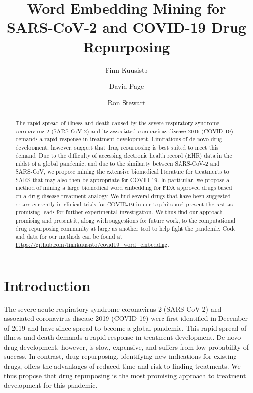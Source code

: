 \documentclass{article}
\begin{document}
\title{Word Embedding Mining for SARS-CoV-2 and COVID-19 Drug Repurposing}
\author[1]{Finn Kuusisto}
\author[2]{David Page}
\author[1]{Ron Stewart}
\maketitle

\begin{abstract}

The rapid spread of illness and death caused by the severe respiratory syndrome coronavirus 2 (SARS-CoV-2) and its associated coronavirus disease 2019 (COVID-19) demands a rapid response in treatment development.
Limitations of de novo drug development, however, suggest that drug repurposing is best suited to meet this demand.
Due to the difficulty of accessing electronic health record (EHR) data in the midst of a global pandemic, and due to the similarity between SARS-CoV-2 and SARS-CoV, we propose mining the extensive biomedical literature for treatments to SARS that may also then be appropriate for COVID-19.
In particular, we propose a method of mining a large biomedical word embedding for FDA approved drugs based on a drug-disease treatment analogy.
We find several drugs that have been suggested or are currently in clinical trials for COVID-19 in our top hits and present the rest as promising leads for further experimental investigation.
We thus find our approach promising and present it, along with suggestions for future work, to the computational drug repurposing community at large as another tool to help fight the pandemic.
Code and data for our methods can be found at \url{https://github.com/finnkuusisto/covid19_word_embedding}.

\end{abstract}

\section{Introduction}

The severe acute respiratory syndrome coronavirus 2 (SARS-CoV-2) and associated coronavirus disease 2019 (COVID-19) were first identified in December of 2019 and have since spread to become a global pandemic\cite{world2020director}.
This rapid spread of illness and death demands a rapid response in treatment development.
De novo drug development, however, is slow, expensive, and suffers from low probability of success\cite{ashburn2004drug}.
In contrast, drug repurposing, identifying new indications for existing drugs, offers the advantages of reduced time and risk to finding treatments.
We thus propose that drug repurposing is the most promising approach to treatment development for this pandemic.
\end{document}
